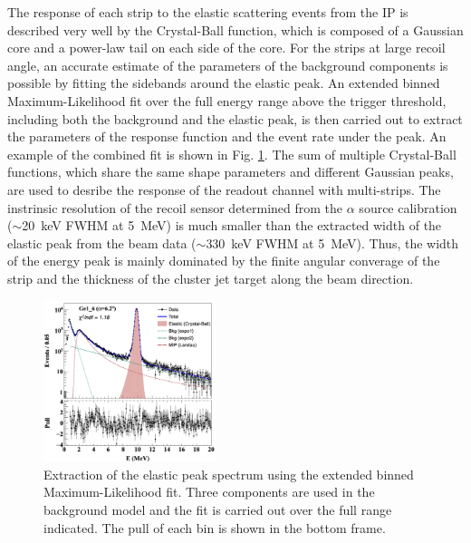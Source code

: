 \documentclass[number,5p]{elsarticle}
\begin{document}
The response of each strip to the elastic scattering events from the IP is described
very well by the Crystal-Ball function\cite{crystal_ball}, which is composed of a Gaussian core and a power-law tail on each side of the core.
For the strips at large recoil angle, an accurate estimate of the parameters of
the background components is possible by fitting the sidebands around the elastic peak.
An extended binned Maximum-Likelihood fit over the full energy range above the
trigger threshold, including both the background and the
elastic peak, is then carried out to extract the parameters of the response function and the event rate under the peak.
An example of the combined fit is shown in Fig. \ref{fig:e_fit}.
The sum of multiple Crystal-Ball functions, which share the same shape parameters and
different Gaussian peaks, are used to desribe the response of the readout channel with multi-strips. 
The instrinsic resolution of the recoil sensor determined from the $\alpha$ source
calibration ($\sim$\SI{20}{\keV} FWHM at \SI{5}{\MeV}) is much smaller than the
extracted width of the elastic peak from the beam data ($\sim$\SI{330}{\keV}
FWHM at \SI{5}{\MeV}).
Thus, the width of the energy peak is mainly dominated by the finite
angular converage of the strip and the thickness of the cluster jet target along the beam direction.
\begin{figure}[tb!]
  \centering
  \includegraphics[width=0.45\textwidth]{./e_fit.png}
  \caption{Extraction of the elastic peak spectrum using the extended binned
    Maximum-Likelihood fit. Three components are used in the background model
    and the fit is carried out over the full range indicated. The pull of each bin
    is shown in the bottom frame.}
  \label{fig:e_fit}
\end{figure}
\end{document}
